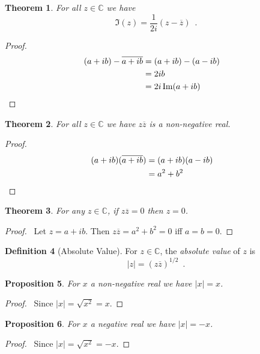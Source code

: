 \documentclass{book}
\let\qed\relax
\newtheorem{prop}{Proposition}[chapter]
\newtheorem{thm}[prop]{Theorem}
\theoremstyle{definition}
\newtheorem{df}[prop]{Definition}
\begin{document}
\begin{thm}
For all $z \in \mathbb{C}$ we have
\[ \Im(z) = \frac{1}{2i} (z - \overline{z}) \enspace . \]
\end{thm}

\begin{proof}
\pf
\begin{align*}
(a+ib) - \overline{a+ib} & = (a+ib) - (a-ib) \\
& = 2ib \\
& = 2 i\Im(a+ib) & \qed
\end{align*}
\end{proof}

\begin{thm}
For all $z \in \mathbb{C}$ we have $z \overline{z}$ is a non-negative real.
\end{thm}

\begin{proof}
\pf
\begin{align*}
(a+ib) (\overline{a+ib}) & = (a+ib)(a-ib) \\
& = a^2 + b^2 & \qed
\end{align*}
\end{proof}

\begin{thm}
\label{thm:zz_zero}
For any $z \in \mathbb{C}$, if $z \overline{z} = 0$ then $z = 0$.
\end{thm}

\begin{proof}
\pf\ Let $z = a + ib$. Then $z \overline{z} = a^2 + b^2 = 0$ iff $a = b = 0$. \qed
\end{proof}

\begin{df}[Absolute Value]
For $z \in \mathbb{C}$, the \emph{absolute value} of $z$ is
\[ |z| = (z \overline{z})^{1/2} \enspace . \]
\end{df}

\begin{prop}
For $x$ a non-negative real we have $|x| = x$.
\end{prop}

\begin{proof}
\pf\ Since $|x| = \sqrt{x^2} = x$. \qed
\end{proof}

\begin{prop}
For $x$ a negative real we have $|x| = -x$.
\end{prop}

\begin{proof}
\pf\ Since $|x| = \sqrt{x^2} = -x$. \qed
\end{proof}
\end{document}
